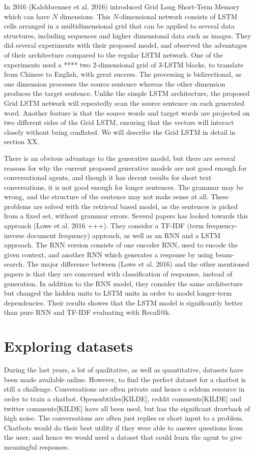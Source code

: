 \documentclass{article} %
\begin{document}
In 2016 (Kalchbrenner et al. 2016) introduced Grid Long Short-Term Memory which can have $N$ dimensions. This $N$-dimensional network consists of LSTM cells arranged in a multidimensional grid that can be applied to several data structures, including sequences and higher dimensional data such as images. They did several experiments with their proposed model, and observed the advantages of their architecture compared to the regular LSTM network. One of the experiments used a **** two 2-dimensional grid of 3-LSTM blocks, to translate from Chinese to English, with great success. The processing is bidirectional, as one dimension processes the source sentence whereas the other dimension produces the target sentence. Unlike the simple LSTM architecture, the proposed Grid LSTM network will repeatedly scan the source sentence on each generated word. Another feature is that the source words and target words are projected on two different sides of the Grid LSTM, ensuring that the vectors will interact closely without being conflated. We will describe the Grid LSTM in detail in section XX. 

There is an obvious advantage to the generative model, but there are several reasons for why the current proposed generative models are not good enough for conversational agents, and though it has decent results for short text conversations, it is not good enough for longer sentences. The grammar may be wrong, and the structure of the sentence may not make sense at all. These problems are solved with the retrieval based model, as the sentences is picked from a fixed set, without grammar errors. Several papers has looked towards this approach (Lowe et al. 2016 +++). They consider a TF-IDF (term frequency-inverse document frequency) approach, as well as an RNN and a LSTM approach. The RNN version consists of one encoder RNN, used to encode the given context, and another RNN which generates a response by using beam-search. The major difference between (Lowe et al. 2016) and the other mentioned papers is that they are concerned with classification of responses, instead of generation. In addition to the RNN model, they consider the same architecture but changed the hidden units to LSTM units in order to model longer-term dependencies. Their results showes that the LSTM model is significantly better than pure RNN and TF-IDF evaluating with Recall@k.

\section{Exploring datasets}
During the last years, a lot of qualitative, as well as quantitative, datasets have been made available online. However, to find the perfect dataset for a chatbot is still a challenge. Conversations are often private and hence a seldom resource in order to train a chatbot. Opensubtitles[KILDE], reddit comments[KILDE] and twitter comments[KILDE] have all been used, but has the significant drawback of high noise. The conversations are often just replies or short input to a problem. Chatbots would do their best utility if they were able to answer questions from the user, and hence we would need a dataset that could learn the agent to give meaningful responses.
\end{document}
